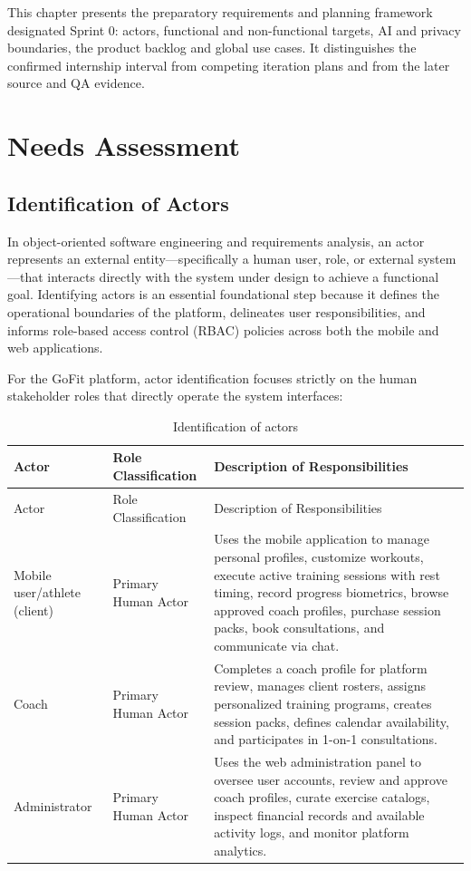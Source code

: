 \documentclass[12pt,a4paper,openany]{report}
\begin{document}
This chapter presents the preparatory requirements and planning framework designated Sprint 0: actors, functional and non-functional targets, AI and privacy boundaries, the product backlog and global use cases. It distinguishes the confirmed internship interval from competing iteration plans and from the later source and QA evidence.

\section{Needs Assessment}

\subsection{Identification of Actors}


In object-oriented software engineering and requirements analysis, an actor represents an external entity---specifically a human user, role, or external system---that interacts directly with the system under design to achieve a functional goal. Identifying actors is an essential foundational step because it defines the operational boundaries of the platform, delineates user responsibilities, and informs role-based access control (RBAC) policies across both the mobile and web applications.

For the GoFit platform, actor identification focuses strictly on the human stakeholder roles that directly operate the system interfaces:

\begingroup
\footnotesize
\setlength{\tabcolsep}{3pt}
\renewcommand{\arraystretch}{1.20}
\setlength{\LTpre}{5pt}
\setlength{\LTpost}{10pt}
\begin{longtable}{|L{3.67cm}|L{3.29cm}|L{7.73cm}|}
\caption{Identification of actors}\label{tab:pdf-16-5} \\
\hline
{}
Actor & Role Classification & Description of Responsibilities \\ \hline
\endfirsthead
\hline
{}
Actor & Role Classification & Description of Responsibilities \\ \hline
\endhead
Mobile user/athlete (client) & Primary Human Actor & Uses the mobile application to manage personal profiles, customize workouts, execute active training sessions with rest timing, record progress biometrics, browse approved coach profiles, purchase session packs, book consultations, and communicate via chat. \\ \hline
Coach & Primary Human Actor & Completes a coach profile for platform review, manages client rosters, assigns personalized training programs, creates session packs, defines calendar availability, and participates in 1-on-1 consultations. \\ \hline
Administrator & Primary Human Actor & Uses the web administration panel to oversee user accounts, review and approve coach profiles, curate exercise catalogs, inspect financial records and available activity logs, and monitor platform analytics. \\ \hline
\end{longtable}
\endgroup
\end{document}
